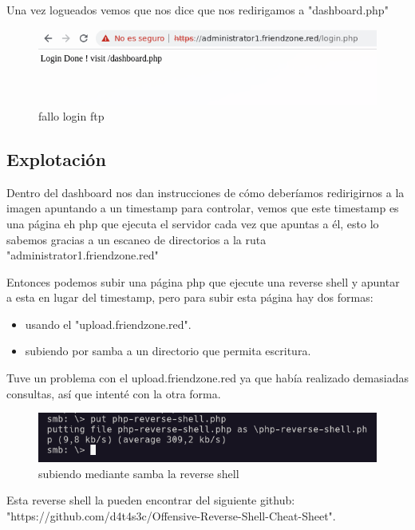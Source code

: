 \documentclass{article}
\begin{document}
Una vez logueados vemos que nos dice que nos redirigamos a "dashboard.php"

\begin{figure}[H]
	\center
	\includegraphics[width=\textwidth]{images/friendzone/login-correcto.png}
	\caption{fallo login ftp}
\end{figure}

\subsection{Explotación}

Dentro del dashboard nos dan instrucciones de cómo deberíamos redirigirnos a la imagen apuntando a un timestamp para controlar, vemos que este timestamp es una página eh php que ejecuta el servidor cada vez que apuntas a él, esto lo sabemos gracias a un escaneo de directorios a la ruta "administrator1.friendzone.red"

Entonces podemos subir una página php que ejecute una reverse shell y apuntar a esta en lugar del timestamp, pero para subir esta página hay dos formas:
\begin{itemize}
	\item usando el "upload.friendzone.red".
	\item subiendo por samba a un directorio que permita escritura.
\end{itemize}

Tuve un problema con el upload.friendzone.red ya que había realizado demasiadas consultas, así que intenté con la otra forma.

\begin{figure}[H]
	\center
	\includegraphics[width=\textwidth]{images/friendzone/subiendo-reverse.png}
	\caption{subiendo mediante samba la reverse shell}
\end{figure}

Esta reverse shell la pueden encontrar del siguiente github: "https://github.com/d4t4s3c/Offensive-Reverse-Shell-Cheat-Sheet".
\end{document}
